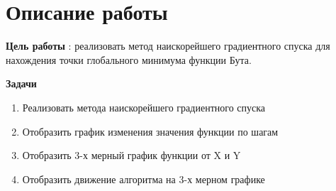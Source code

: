 \documentclass{article}%
\begin{document}
\section{Описание работы}%
\begin{flushleft}%
\textbf{Цель работы}%
: реализовать метод наискорейшего градиентного спуска для нахождения точки глобального минимума функции Бута.%
%
\end{flushleft}%
\begin{center}%
\textbf{Задачи}%
%
\end{center}%
\begin{enumerate}%
\item Реализовать метода наискорейшего градиентного спуска%
%
\item Отобразить график изменения значения функции по шагам%
%
\item Отобразить 3-х мерный график функции от X и Y%
%
\item Отобразить движение алгоритма на 3-х мерном графике%
%
\end{enumerate}%
\end{document}
